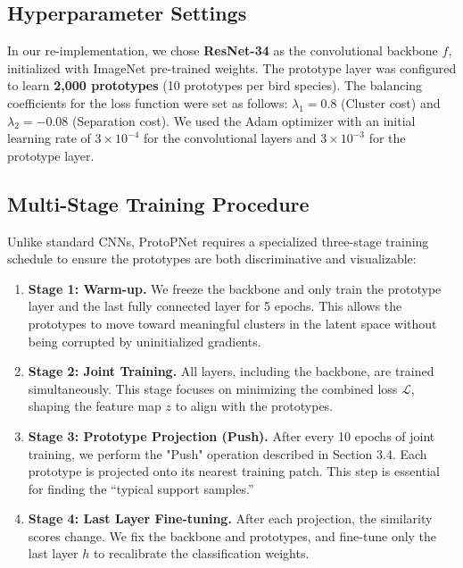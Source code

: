 \documentclass[conference]{IEEEtran}
\begin{document}
\subsection{Hyperparameter Settings}
In our re-implementation, we chose \textbf{ResNet-34} as the convolutional backbone $f$, initialized with ImageNet pre-trained weights. The prototype layer was configured to learn \textbf{2,000 prototypes} (10 prototypes per bird species).
The balancing coefficients for the loss function were set as follows: $\lambda_1 = 0.8$ (Cluster cost) and $\lambda_2 = -0.08$ (Separation cost). We used the Adam optimizer with an initial learning rate of $3 \times 10^{-4}$ for the convolutional layers and $3 \times 10^{-3}$ for the prototype layer.

\subsection{Multi-Stage Training Procedure}
Unlike standard CNNs, ProtoPNet requires a specialized three-stage training schedule to ensure the prototypes are both discriminative and visualizable:

\begin{enumerate}
    \item \textbf{Stage 1: Warm-up.} We freeze the backbone and only train the prototype layer and the last fully connected layer for 5 epochs. This allows the prototypes to move toward meaningful clusters in the latent space without being corrupted by uninitialized gradients.
    \item \textbf{Stage 2: Joint Training.} All layers, including the backbone, are trained simultaneously. This stage focuses on minimizing the combined loss $\mathcal{L}$, shaping the feature map $z$ to align with the prototypes.
    \item \textbf{Stage 3: Prototype Projection (Push).} After every 10 epochs of joint training, we perform the "Push" operation described in Section 3.4. Each prototype is projected onto its nearest training patch. This step is essential for finding the ``typical support samples.''
    \item \textbf{Stage 4: Last Layer Fine-tuning.} After each projection, the similarity scores change. We fix the backbone and prototypes, and fine-tune only the last layer $h$ to recalibrate the classification weights.
\end{enumerate}
\end{document}
